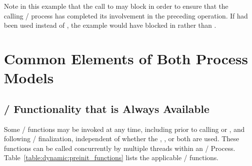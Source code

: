 Note in this example that the call to  may block in order to
ensure that the calling \MPI/ process has completed its involvement in the preceding  operation.  If  had been used instead of , the example would have blocked in  rather than .


\section{Common Elements of Both Process Models}
\label{sec:dynamic:common-elements}

\subsection{\texorpdfstring{\MPI/}{MPI} Functionality that is Always Available}
\label{subsec:dynamic:preinit_functions}

Some \MPI/ functions may be invoked
at any time, including
prior to calling  or ,
and following \MPI/ finalization,
independent of whether the \wpm{}, \spm{}, or both are used.
These functions can be called concurrently by multiple threads within an \MPI/ Process.
Table~\ref{table:dynamic:preinit_functions} lists the applicable \MPI/ functions.


